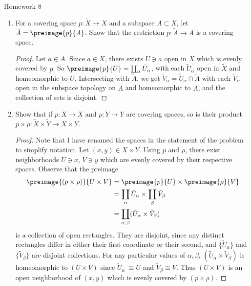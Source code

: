 \documentclass[12pt,letterpaper]{article}
\begin{document}
\pagestyle{fancy}
\begin{center}
{\Large Homework 8}%
\end{center}

\begin{enumerate}

\item For a covering space $p:\tilde{X}\to X$ and a subspace $A\subset X$, let $\tilde{A}=\preimage{p}{A}$. Show that the restriction $p:\tilde{A}\to A$ is a covering space. 

\begin{proof}
Let $a\in A$. Since $a\in X$, there exists $U\ni a$ open in $X$ which is evenly covered by $p$. So $\preimage{p}{U}=\coprod_\alpha \tilde{U}_\alpha$, with each $\tilde{U}_\alpha$ open in $\tilde{X}$ and homeomorphic to $U$. Intersecting with $\tilde{A}$, we get $\tilde{V}_\alpha=\tilde{U}_\alpha\cap \tilde{A}$  with each $\tilde{V}_\alpha$ open in the subspace topology on $\tilde{A}$ and homeomorphic to $\tilde{A}$, and the collection of sets is disjoint. 
\end{proof}


\item Show that if $p:\tilde{X}\to X$ and $\rho:\tilde{Y}\to Y$ are covering spaces, so is their product $p\times \rho:\tilde{X}\times \tilde{Y}\to X\times Y$. 

\begin{proof} Note that I have renamed the spaces in the statement of the problem to simplify notation. Let $(x, y)\in X\times Y$. Using $p$ and $\rho$, there exist neighborhoods $U\ni x$, $V \ni y$ which are evenly covered by their respective spaces. Observe that the preimage 
\begin{align*}
\preimage{(p\times \rho)}{U\times V}&=\preimage{p}{U}\times \preimage{\rho}{V} \\
&=\coprod_\alpha \tilde{U}_\alpha \times \coprod_\beta \tilde{V}_\beta \\
&= \coprod_{\alpha, \beta} (\tilde{U}_\alpha \times\tilde{V}_\beta)
\end{align*}
is a collection of open rectangles. They are disjoint, since any distinct rectangles differ in either their first coordinate or their second, and $\{\tilde{U}_\alpha\}$ and $\{\tilde{V}_\beta\}$ are disjoint collections. For any particular values of $\alpha, \beta$, $(\tilde{U}_\alpha \times\tilde{V}_\beta)$ is homeomorphic to $(U\times V)$ since $\tilde{U}_\alpha\ \cong U$ and $\tilde{V}_\beta \cong V$. Thus $(U\times V)$ is an open neighborhood of $(x,y)$ which is evenly covered by $(p\times \rho)$. 
\end{proof}



\end{enumerate}
\end{document}
